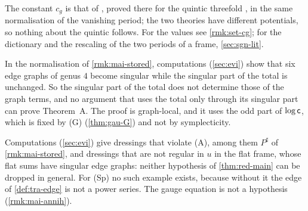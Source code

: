 \begin{rmk}
\label{rmk:mai-constant}
The constant $c_g$ is that of \cite[Conj.~1.5]{CGYZ26}, proved there for the quintic threefold \cite[Thm.~2]{CGYZ26}, in the same normalisation of the vanishing period; the two theories have different potentials, so nothing about the quintic follows. For the values see \cref{rmk:set-cg}; for the dictionary and the rescaling of the two periods of a frame, \cref{sec:sgn-lit}.
\end{rmk}

\begin{rmk}
\label{rmk:mai-graphlocal}
In the normalisation of \cref{rmk:mai-stored}, computations (\cref{sec:evi}) show that six edge graphs of genus $4$ become singular while the singular part of the total is unchanged. So the singular part of the total does not determine those of the graph terms, and no argument that uses the total only through its singular part can prove Theorem~A. The proof is graph-local, and it uses the odd part of $\log\mathsf{c}$, which is fixed by (G) (\cref{thm:gau-G}) and not by symplecticity.
\end{rmk}

\begin{rmk}
\label{rmk:mai-necessity}
Computations (\cref{sec:evi}) give dressings that violate (A), among them $P^\sharp$ of \cref{rmk:mai-stored}, and dressings that are not regular in $u$ in the flat frame, whose flat sums have singular edge graphs: neither hypothesis of \cref{thm:red-main} can be dropped in general. For (Sp) no such example exists, because without it the edge of \cref{def:tra-edge} is not a power series. The gauge equation is not a hypothesis (\cref{rmk:mai-annih}).
\end{rmk}
